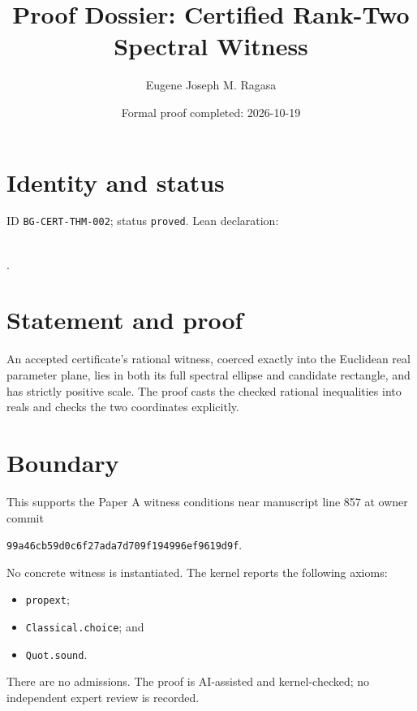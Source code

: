 \documentclass[11pt]{article}
\title{Proof Dossier: Certified Rank-Two Spectral Witness}\author{Eugene Joseph M. Ragasa}\date{Formal proof completed: 2026-10-19}
\begin{document}
\maketitle
\section{Identity and status}
ID \texttt{BG-CERT-THM-002}; status \texttt{proved}. Lean declaration:
\par{}\\
{\tiny{}}.
\section{Statement and proof}
An accepted certificate's rational witness, coerced exactly into the Euclidean real
parameter plane, lies in both its full spectral ellipse and candidate rectangle, and has
strictly positive scale. The proof casts the checked rational inequalities into reals and
checks the two coordinates explicitly.
\section{Boundary}
This supports the Paper A witness conditions near manuscript line 857 at owner commit
\begin{center}\small\texttt{99a46cb59d0c6f27ada7d709f194996ef9619d9f}.\end{center}
No concrete witness is instantiated. The kernel reports the following axioms:
\begin{itemize}
\item \texttt{propext};
\item \texttt{Classical.choice}; and
\item \texttt{Quot.sound}.
\end{itemize}
There are no admissions. The proof is AI-assisted and kernel-checked; no independent
expert review is recorded.
\end{document}

